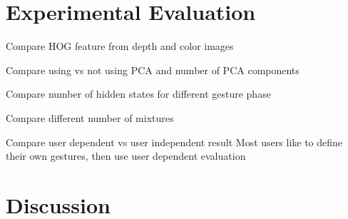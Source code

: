 \documentclass[conference]{IEEEtran}
\begin{document}
\section{Experimental Evaluation}

Compare HOG feature from depth and color images

Compare using vs not using PCA and number of PCA components

Compare number of hidden states for different gesture phase

Compare different number of mixtures

Compare user dependent vs user independent result
Most users like to define their own gestures, then use user dependent evaluation

\section{Discussion}
%
%



%
%
\end{document}

